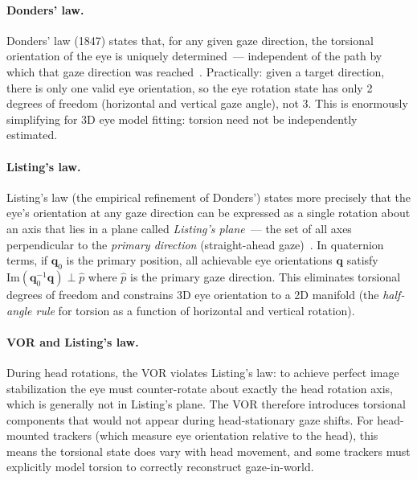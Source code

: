 \documentclass[11pt,a4paper]{article}
\begin{document}
\paragraph{Donders' law.}
Donders' law (1847) states that, for any given gaze direction, the torsional orientation of the eye is uniquely determined~--- independent of the path by which that gaze direction was reached~\cite{donders1870accommodation}.
Practically: given a target direction, there is only one valid eye orientation, so the eye rotation state has only 2 degrees of freedom (horizontal and vertical gaze angle), not 3.
This is enormously simplifying for 3D eye model fitting: torsion need not be independently estimated.

\paragraph{Listing's law.}
Listing's law (the empirical refinement of Donders') states more precisely that the eye's orientation at any gaze direction can be expressed as a single rotation about an axis that lies in a plane called \textit{Listing's plane}~--- the set of all axes perpendicular to the \textit{primary direction} (straight-ahead gaze)~\cite{listing1854beitrag,tweed1990implications}.
In quaternion terms, if $\mathbf{q}_0$ is the primary position, all achievable eye orientations $\mathbf{q}$ satisfy $\text{Im}(\mathbf{q}_0^{-1} \mathbf{q}) \perp \hat{p}$ where $\hat{p}$ is the primary gaze direction.
This eliminates torsional degrees of freedom and constrains 3D eye orientation to a 2D manifold (the \emph{half-angle rule} for torsion as a function of horizontal and vertical rotation).

\paragraph{VOR and Listing's law.}
During head rotations, the VOR violates Listing's law: to achieve perfect image stabilization the eye must counter-rotate about exactly the head rotation axis, which is generally not in Listing's plane.
The VOR therefore introduces torsional components that would not appear during head-stationary gaze shifts.
For head-mounted trackers (which measure eye orientation relative to the head), this means the torsional state does vary with head movement, and some trackers must explicitly model torsion to correctly reconstruct gaze-in-world.
\end{document}
